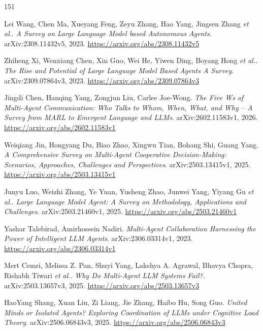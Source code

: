 \documentclass[11pt,a4paper]{article}
\begin{document}
\begin{thebibliography}{151}
\setlength{\itemsep}{2pt}

Lei Wang, Chen Ma, Xueyang Feng, Zeyu Zhang, Hao Yang, Jingsen Zhang \emph{et al.}.
\newblock \emph{A Survey on Large Language Model based Autonomous Agents}.
\newblock arXiv:2308.11432v5, 2023.
\newblock \url{https://arxiv.org/abs/2308.11432v5}

Zhiheng Xi, Wenxiang Chen, Xin Guo, Wei He, Yiwen Ding, Boyang Hong \emph{et al.}.
\newblock \emph{The Rise and Potential of Large Language Model Based Agents A Survey}.
\newblock arXiv:2309.07864v3, 2023.
\newblock \url{https://arxiv.org/abs/2309.07864v3}

Jingdi Chen, Hanqing Yang, Zongjun Liu, Carlee Joe-Wong.
\newblock \emph{The Five Ws of Multi-Agent Communication: Who Talks to Whom, When, What, and Why -- A Survey from MARL to Emergent Language and LLMs}.
\newblock arXiv:2602.11583v1, 2026.
\newblock \url{https://arxiv.org/abs/2602.11583v1}

Weiqiang Jin, Hongyang Du, Biao Zhao, Xingwu Tian, Bohang Shi, Guang Yang.
\newblock \emph{A Comprehensive Survey on Multi-Agent Cooperative Decision-Making: Scenarios, Approaches, Challenges and Perspectives}.
\newblock arXiv:2503.13415v1, 2025.
\newblock \url{https://arxiv.org/abs/2503.13415v1}

Junyu Luo, Weizhi Zhang, Ye Yuan, Yusheng Zhao, Junwei Yang, Yiyang Gu \emph{et al.}.
\newblock \emph{Large Language Model Agent: A Survey on Methodology, Applications and Challenges}.
\newblock arXiv:2503.21460v1, 2025.
\newblock \url{https://arxiv.org/abs/2503.21460v1}

Yashar Talebirad, Amirhossein Nadiri.
\newblock \emph{Multi-Agent Collaboration Harnessing the Power of Intelligent LLM Agents}.
\newblock arXiv:2306.03314v1, 2023.
\newblock \url{https://arxiv.org/abs/2306.03314v1}

Mert Cemri, Melissa Z. Pan, Shuyi Yang, Lakshya A. Agrawal, Bhavya Chopra, Rishabh Tiwari \emph{et al.}.
\newblock \emph{Why Do Multi-Agent LLM Systems Fail?}.
\newblock arXiv:2503.13657v3, 2025.
\newblock \url{https://arxiv.org/abs/2503.13657v3}

HaoYang Shang, Xuan Liu, Zi Liang, Jie Zhang, Haibo Hu, Song Guo.
\newblock \emph{United Minds or Isolated Agents? Exploring Coordination of LLMs under Cognitive Load Theory}.
\newblock arXiv:2506.06843v3, 2025.
\newblock \url{https://arxiv.org/abs/2506.06843v3}


\end{thebibliography}
\end{document}
